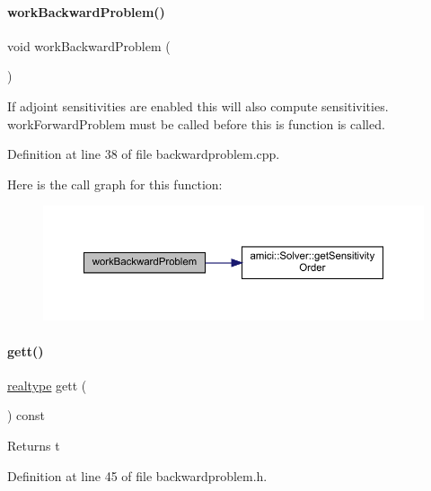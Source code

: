 \paragraph{\texorpdfstring{workBackwardProblem()}{workBackwardProblem()}}
{\footnotesize\ttfamily void work\+Backward\+Problem (\begin{DoxyParamCaption}{ }\end{DoxyParamCaption})}

If adjoint sensitivities are enabled this will also compute sensitivities. work\+Forward\+Problem must be called before this is function is called. 

Definition at line 38 of file backwardproblem.\+cpp.

Here is the call graph for this function\+:
\nopagebreak
\begin{figure}[H]
\begin{center}
\leavevmode
\includegraphics[width=350pt]{classamici_1_1_backward_problem_a4a17093ee76348cce97b06c94bf518bd_cgraph}
\end{center}
\end{figure}
\mbox{\label{classamici_1_1_backward_problem_a1582a658df3f51a8c88b6f22b4205b3f}} 
\paragraph{\texorpdfstring{gett()}{gett()}}
{\footnotesize\ttfamily \mbox{\hyperlink{namespaceamici_a1bdce28051d6a53868f7ccbf5f2c14a3}{realtype}} gett (\begin{DoxyParamCaption}{ }\end{DoxyParamCaption}) const}

\begin{DoxyReturn}{Returns}
t 
\end{DoxyReturn}


Definition at line 45 of file backwardproblem.\+h.

